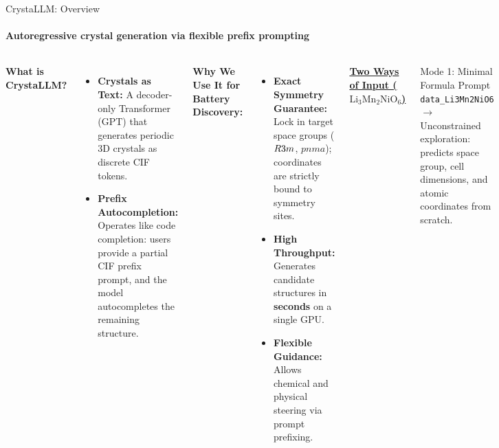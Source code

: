 \documentclass[aspectratio=169, 11pt]{beamer}
\begin{document}
\begin{frame}{CrystaLLM: Overview~\cite{antunes2024crystallm}}
\framesubtitle{Autoregressive crystal generation via flexible prefix prompting}
\vspace{-0.15cm}
\begin{columns}[T]
    \footnotesize
    \textbf{What is CrystaLLM?}
    \begin{itemize}\itemsep0.3em
        \item \textbf{Crystals as Text:} A decoder-only Transformer (GPT) that generates periodic 3D crystals as discrete CIF tokens.
        \item \textbf{Prefix Autocompletion:} Operates like code completion: users provide a partial CIF prefix prompt, and the model autocompletes the remaining structure.
    \end{itemize}

    \vspace{0.15cm}
    \textbf{Why We Use It for Battery Discovery:}
    \begin{itemize}\itemsep0.3em
        \item \textbf{Exact Symmetry Guarantee:} Lock in target space groups ($R\-3m$, $pnma$); coordinates are strictly bound to symmetry sites.
        \item \textbf{High Throughput:} Generates candidate structures in \textbf{seconds} on a single GPU.
        \item \textbf{Flexible Guidance:} Allows chemical and physical steering via prompt prefixing.
    \end{itemize}

    \footnotesize
    \textbf{\underline{Two Ways of Input ($\text{Li}_3\text{Mn}_2\text{NiO}_6$)}}
    \vspace{-0.1cm}

    \begin{block}{\footnotesize Mode 1: Minimal Formula Prompt}
      \vspace{0.05cm}
      \texttt{\footnotesize data\_Li3Mn2NiO6} \\
      \vspace{0.08cm}
      {\scriptsize \textcolor{black!70}{$\to$ Unconstrained exploration: predicts space group, cell dimensions, and atomic coordinates from scratch.}}
    \end{block}
    \vspace{-0.2cm}


\end{columns}
\end{frame}
\end{document}
